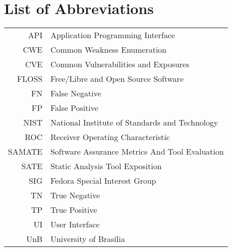 \chapter*{List of Abbreviations}
\begin{tabular}{rl}
  API & Application Programming Interface \\
  CWE & Common Weakness Enumeration \\
  CVE & Common Vulnerabilities and Exposures \\
  FLOSS & Free/Libre and Open Source Software \\
  FN & False Negative \\
  FP & False Positive \\
  NIST & National Institute of Standards and Technology \\
  ROC & Receiver Operating Characteristic \\
  SAMATE & Software Assurance Metrics And Tool Evaluation \\
  SATE & Static Analysis Tool Exposition \\
  SIG & Fedora Special Interest Group \\
  TN & True Negative \\
  TP & True Positive \\
  UI & User Interface \\
  UnB & University of Brasília

\end{tabular}



\listoffigures

\listoftables

